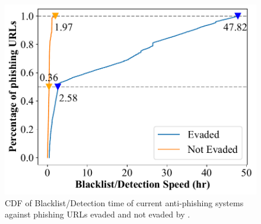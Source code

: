 \begin{figure}
\centering
\includegraphics[width=\linewidth]{figs/evade_bl_time_total.pdf}
\caption{CDF of Blacklist/Detection time of current anti-phishing systems against phishing URLs evaded and not evaded by \spartacus.}
\label{fig:evade_bl_time}
\end{figure}